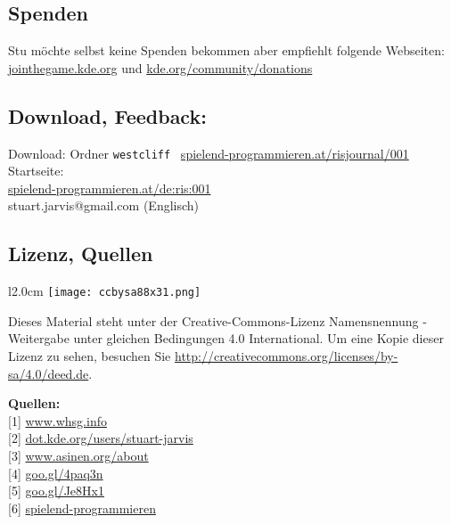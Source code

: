 \documentclass[10pt,a4paper,ngerman,twoside]{article} %
\newcommand{\SepRule}{\noindent	%
\begin{center}
\rule{250pt}{1pt} %
\end{center}
}
\begin{document}
\subsection*{Spenden}
Stu möchte selbst keine Spenden bekommen aber empfiehlt folgende Webseiten:
\href{http://jointhegame.kde.org}{jointhegame.kde.org} und \href{http://www.kde.org/community/donations/index.php}{kde.org/community/donations}

\subsection*{Download, Feedback:}
\footnotesize{
Download: Ordner \texttt{westcliff} \Mundus\ \href{http://spielend-programmieren.at/risjournal/001}{spielend-programmieren.at/risjournal/001}\\
Startseite:\\
\href{http://spielend-programmieren.at/de:ris:001}{spielend-programmieren.at/de:ris:001}\\ 
\Letter\: stuart.jarvis@gmail.com (Englisch)\\}
\normalsize
 
\subsection*{Lizenz, Quellen}
\begin{wrapfigure}{l}{2.0cm}
\texttt{[image: ccbysa88x31.png]} \\ 
\end{wrapfigure}
Dieses Material steht unter der Creative-Commons-Lizenz Namensnennung - Weitergabe unter gleichen Bedingungen 4.0 International. Um eine Kopie dieser Lizenz zu sehen, besuchen Sie \url{http://creativecommons.org/licenses/by-sa/4.0/deed.de}.

\textbf{Quellen:} \\
{[}1{]} \href{http://www.whsg.info}{www.whsg.info} \\
{[}2{]} \href{http://dot.kde.org/users/stuart-jarvis}{dot.kde.org/users/stuart-jarvis} \\
{[}3{]} \href{http://www.asinen.org/about/}{www.asinen.org/about} \\
{[}4{]} \href{http://goo.gl/4paq3n}{goo.gl/4paq3n} \\
{[}5{]} \href{http://goo.gl/Je8Hx1}{goo.gl/Je8Hx1} \\
{[}6{]} \href{http://spielend-programmieren.at}{spielend-programmieren}


\end{document}
